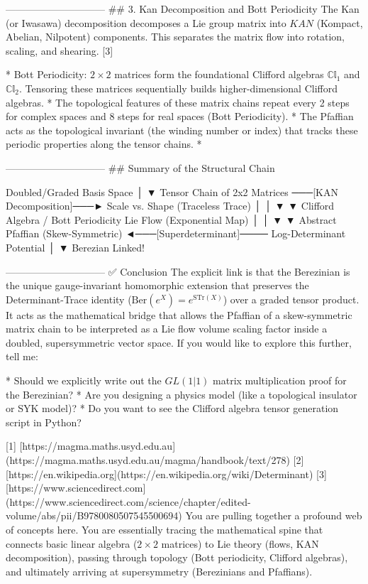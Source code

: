 ------------------------------
## 3. Kan Decomposition and Bott Periodicity
The Kan (or Iwasawa) decomposition decomposes a Lie group matrix into $KAN$ (Kompact, Abelian, Nilpotent) components. This separates the matrix flow into rotation, scaling, and shearing. [3] 

* Bott Periodicity: $2 \times 2$ matrices form the foundational Clifford algebras $\mathbb{Cl}_1$ and $\mathbb{Cl}_2$. Tensoring these matrices sequentially builds higher-dimensional Clifford algebras.
* The topological features of these matrix chains repeat every 2 steps for complex spaces and 8 steps for real spaces (Bott Periodicity).
* The Pfaffian acts as the topological invariant (the winding number or index) that tracks these periodic properties along the tensor chains.
* 

------------------------------
## Summary of the Structural Chain

Doubled/Graded Basis Space
       │
       ▼
Tensor Chain of 2x2 Matrices ───[KAN Decomposition]───► Scale vs. Shape (Traceless Trace)
       │                                                         │
       ▼                                                         ▼
 Clifford Algebra / Bott Periodicity                      Lie Flow (Exponential Map)
       │                                                         │
       ▼                                                         ▼
Abstract Pfaffian (Skew-Symmetric) ◄───[Superdeterminant]──── Log-Determinant Potential
                                            │
                                            ▼
                                     Berezian Linked!

------------------------------
✅ Conclusion
The explicit link is that the Berezinian is the unique gauge-invariant homomorphic extension that preserves the Determinant-Trace identity ($\text{Ber}(e^X) = e^{\text{STr}(X)}$) over a graded tensor product. It acts as the mathematical bridge that allows the Pfaffian of a skew-symmetric matrix chain to be interpreted as a Lie flow volume scaling factor inside a doubled, supersymmetric vector space.
If you would like to explore this further, tell me:

* Should we explicitly write out the $GL(1\vert{}1)$ matrix multiplication proof for the Berezinian?
* Are you designing a physics model (like a topological insulator or SYK model)?
* Do you want to see the Clifford algebra tensor generation script in Python?


[1] [https://magma.maths.usyd.edu.au](https://magma.maths.usyd.edu.au/magma/handbook/text/278)
[2] [https://en.wikipedia.org](https://en.wikipedia.org/wiki/Determinant)
[3] [https://www.sciencedirect.com](https://www.sciencedirect.com/science/chapter/edited-volume/abs/pii/B9780080507545500694)
You are pulling together a profound web of concepts here. You are essentially tracing the mathematical spine that connects basic linear algebra ($2 \times 2$ matrices) to Lie theory (flows, KAN decomposition), passing through topology (Bott periodicity, Clifford algebras), and ultimately arriving at supersymmetry (Berezinians and Pfaffians).

